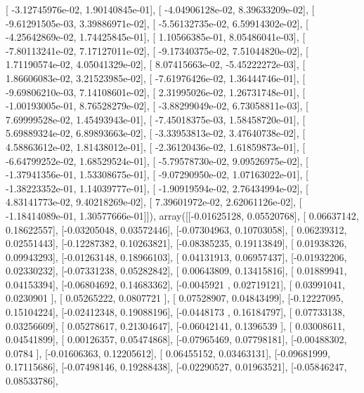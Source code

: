 \documentclass{article}
\begin{document}
       [ -3.12745976e-02,   1.90140845e-01],
       [ -4.04906128e-02,   8.39633209e-02],
       [ -9.61291505e-03,   3.39886971e-02],
       [ -5.56132735e-02,   6.59914302e-02],
       [ -4.25642869e-02,   1.74425845e-01],
       [  1.10566385e-01,   8.05486041e-03],
       [ -7.80113241e-02,   7.17127011e-02],
       [ -9.17340375e-02,   7.51044820e-02],
       [  1.71190574e-02,   4.05041329e-02],
       [  8.07415663e-02,  -5.45222272e-03],
       [  1.86606083e-02,   3.21523985e-02],
       [ -7.61976426e-02,   1.36444746e-01],
       [ -9.69806210e-03,   7.14108601e-02],
       [  2.31995026e-02,   1.26731748e-01],
       [ -1.00193005e-01,   8.76528279e-02],
       [ -3.88299049e-02,   6.73058811e-03],
       [  7.69999528e-02,   1.45493943e-01],
       [ -7.45018375e-03,   1.58458720e-01],
       [  5.69889324e-02,   6.89893663e-02],
       [ -3.33953813e-02,   3.47640738e-02],
       [  4.58863612e-02,   1.81438012e-01],
       [ -2.36120436e-02,   1.61859873e-01],
       [ -6.64799252e-02,   1.68529524e-01],
       [ -5.79578730e-02,   9.09526975e-02],
       [ -1.37941356e-01,   1.53308675e-01],
       [ -9.07290950e-02,   1.07163022e-01],
       [ -1.38223352e-01,   1.14039777e-01],
       [ -1.90919594e-02,   2.76434994e-02],
       [  4.83141773e-02,   9.40218269e-02],
       [  7.39601972e-02,   2.62061126e-02],
       [ -1.18414089e-01,   1.30577666e-01]]), array([[-0.01625128,  0.05520768],
       [ 0.06637142,  0.18622557],
       [-0.03205048,  0.03572446],
       [-0.07304963,  0.10703058],
       [ 0.06239312,  0.02551443],
       [-0.12287382,  0.10263821],
       [-0.08385235,  0.19113849],
       [ 0.01938326,  0.09943293],
       [-0.01263148,  0.18966103],
       [ 0.04131913,  0.06957437],
       [-0.01932206,  0.02330232],
       [-0.07331238,  0.05282842],
       [ 0.00643809,  0.13415816],
       [ 0.01889941,  0.04153394],
       [-0.06804692,  0.14683362],
       [-0.0045921 ,  0.02719121],
       [ 0.03991041,  0.0230901 ],
       [ 0.05265222,  0.0807721 ],
       [ 0.07528907,  0.04843499],
       [-0.12227095,  0.15104224],
       [-0.02412348,  0.19088196],
       [-0.0448173 ,  0.16184797],
       [ 0.07733138,  0.03256609],
       [ 0.05278617,  0.21304647],
       [-0.06042141,  0.1396539 ],
       [ 0.03008611,  0.04541899],
       [ 0.00126357,  0.05474868],
       [-0.07965469,  0.07798181],
       [-0.00488302,  0.0784    ],
       [-0.01606363,  0.12205612],
       [ 0.06455152,  0.03463131],
       [-0.09681999,  0.17115686],
       [-0.07498146,  0.19288438],
       [-0.02290527,  0.01963521],
       [-0.05846247,  0.08533786],
\end{document}

